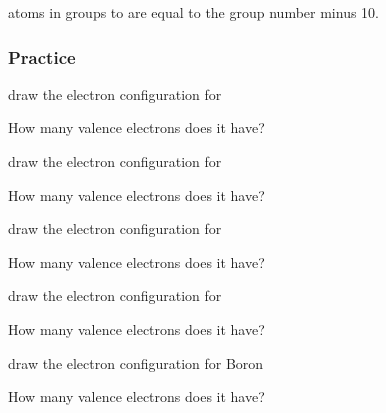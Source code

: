 \documentclass[12pt]{exam}
\begin{document}
\begin{questions}
\question atoms in groups \fillin[13][2cm] to \fillin[18][2cm] are equal to the group number minus 10.


\subsubsection{Practice}

\question draw the electron configuration for 


How many valence electrons does it have? \fillin[1][1cm]


\question draw the electron configuration for 


How many valence electrons does it have? \fillin[2][1cm]

\question draw the electron configuration for 



How many valence electrons does it have? \fillin[1][1cm]

\question draw the electron configuration for 



How many valence electrons does it have? \fillin[1][1cm]

\pagebreak

\question draw the electron configuration for Boron  


How many valence electrons does it have? \fillin[1][1cm]


\end{questions}
\end{document}
